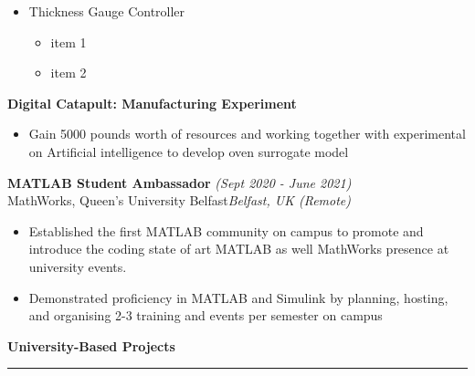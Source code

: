 \documentclass[11pt]{resume} %
\begin{document}
\begin{itemize}
    \item {Thickness Gauge Controller}
        \vspace{-1.5mm}
        \begin{itemize}
            \item{
                item 1
                }
            \vspace{-3mm}
            \item{
                item 2
                }
        \end{itemize}
    \vspace{-1mm}

\end{itemize}

\vspace{3mm}
\hspace{5mm}\textbf{Digital Catapult: Manufacturing Experiment}\\
\begin{itemize}
    \vspace{-6mm}
    \item {Gain 5000 pounds worth of resources and working together with experimental
    on Artificial intelligence to develop oven surrogate model}
\end{itemize}


\vspace{3mm}
\textbf{MATLAB Student Ambassador} \hfill \textit{(Sept 2020 - June 2021)}\\
MathWorks, Queen's University Belfast\hfill \textit{Belfast, UK (Remote)}\\ 
\begin{itemize}
    \vspace{-5mm}
    \item Established the first MATLAB community on campus to promote and introduce the coding state of art MATLAB as well MathWorks presence at university events.
    \item Demonstrated proficiency in MATLAB and Simulink by planning, hosting, and organising 2-3 training and events per semester on campus
\end{itemize}




\vspace{3mm}
{\large \bf University-Based Projects} \sectionlineskip \hrule
\end{document}
